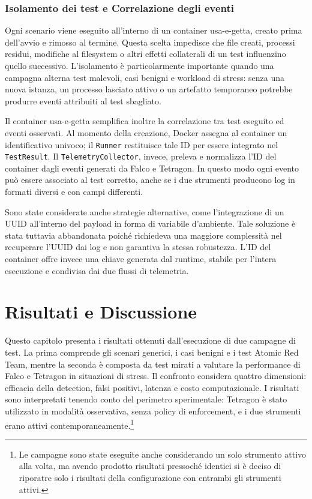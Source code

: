 \documentclass[12pt,a4paper,openright,twoside]{book}
\begin{document}
\subsection{Isolamento dei test e Correlazione degli eventi}
\label{sec:test-isolation-correlation}

Ogni scenario viene eseguito all'interno di un container usa-e-getta, creato prima dell'avvio e rimosso al termine. Questa scelta impedisce che file creati, processi residui, modifiche al filesystem o altri effetti collaterali di un test influenzino quello successivo. L'isolamento è particolarmente importante quando una campagna alterna test malevoli, casi benigni e workload di stress: senza una nuova istanza, un processo lasciato attivo o un artefatto temporaneo potrebbe produrre eventi attribuiti al test sbagliato.

Il container usa-e-getta semplifica inoltre la correlazione tra test eseguito ed eventi osservati. Al momento della creazione, Docker assegna al container un identificativo univoco; il \texttt{Runner} restituisce tale ID per essere integrato nel \texttt{TestResult}. Il \texttt{TelemetryCollector}, invece, preleva e normalizza l'ID del container dagli eventi generati da Falco e Tetragon. In questo modo ogni evento può essere associato al test corretto, anche se i due strumenti producono log in formati diversi e con campi differenti.

Sono state considerate anche strategie alternative, come l'integrazione di un UUID all'interno del payload in forma di variabile d'ambiente. Tale soluzione è stata tuttavia abbandonata poiché richiedeva una maggiore complessità nel recuperare l'UUID dai log e non garantiva la stessa robustezza. L'ID del container offre invece una chiave generata dal runtime, stabile per l'intera esecuzione e condivisa dai due flussi di telemetria.


\chapter{Risultati e Discussione}
\label{chap:results}

Questo capitolo presenta i risultati ottenuti dall'esecuzione di due campagne di test. La prima comprende gli scenari generici, i casi benigni e i test Atomic Red Team, mentre la seconda è composta da test mirati a valutare la performance di Falco e Tetragon in situazioni di stress. Il confronto considera quattro dimensioni: efficacia della detection, falsi positivi, latenza e costo computazionale. I risultati sono interpretati tenendo conto del perimetro sperimentale: Tetragon è stato utilizzato in modalità osservativa, senza policy di enforcement, e i due strumenti erano attivi contemporaneamente.\footnote{Le campagne sono state eseguite anche considerando un solo strumento attivo alla volta, ma avendo prodotto risultati pressoché identici si è deciso di riporatre solo i risultati della configurazione con entrambi gli strumenti attivi.}
\end{document}
